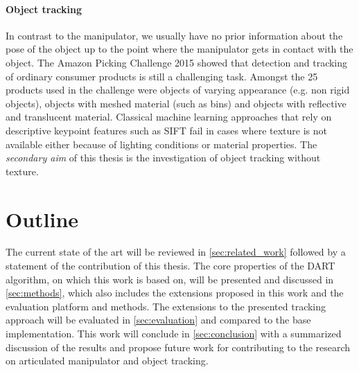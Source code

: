 \paragraph{Object tracking}
In contrast to the manipulator, we usually have no prior information about the pose of the object up to the point where the manipulator gets in contact with the object. The Amazon Picking Challenge 2015 \cite{Correll2016} showed that detection and tracking of ordinary consumer products is still a challenging task. Amongst the 25 products used in the challenge were objects of varying appearance (e.g. non rigid objects), objects with meshed material (such as bins) and objects with reflective and translucent material. Classical machine learning approaches that rely on descriptive keypoint features such as SIFT fail in cases where texture is not available either because of lighting conditions or material properties.
The \emph{secondary aim} of this thesis is the investigation of object tracking without texture.


\section{Outline}

The current state of the art will be reviewed in \cref{sec:related_work} followed by a statement of the contribution of this thesis. The core properties of the DART algorithm, on which this work is based on, will be presented and discussed in \cref{sec:methods}, which also includes the extensions proposed in this work and the evaluation platform and methods. The extensions to the presented tracking approach will be evaluated in \cref{sec:evaluation} and compared to the base implementation. This work will conclude in \cref{sec:conclusion} with a summarized discussion of the results and propose future work for contributing to the research on articulated manipulator and object tracking.
